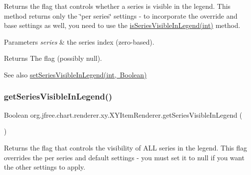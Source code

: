 Returns the flag that controls whether a series is visible in the legend. This method returns only the \char`\"{}per series\char`\"{} settings -\/ to incorporate the override and base settings as well, you need to use the \mbox{\hyperlink{interfaceorg_1_1jfree_1_1chart_1_1renderer_1_1xy_1_1_x_y_item_renderer_a20531f83ddd275c43cd996e59f0e3060}{is\+Series\+Visible\+In\+Legend(int)}} method.


\begin{DoxyParams}{Parameters}
{\em series} & the series index (zero-\/based).\\
\hline
\end{DoxyParams}
\begin{DoxyReturn}{Returns}
The flag (possibly {\ttfamily null}).
\end{DoxyReturn}
\begin{DoxySeeAlso}{See also}
\mbox{\hyperlink{interfaceorg_1_1jfree_1_1chart_1_1renderer_1_1xy_1_1_x_y_item_renderer_a2f4070365d96adda597ae686d9b195db}{set\+Series\+Visible\+In\+Legend(int, Boolean)}} 
\end{DoxySeeAlso}
\mbox{\label{interfaceorg_1_1jfree_1_1chart_1_1renderer_1_1xy_1_1_x_y_item_renderer_af24a5321d6c0f46cdca24e0795f90477}} 
\subsubsection{\texorpdfstring{get\+Series\+Visible\+In\+Legend()}{getSeriesVisibleInLegend()}\hspace{0.1cm}{\footnotesize\ttfamily [2/2]}}
{\footnotesize\ttfamily Boolean org.\+jfree.\+chart.\+renderer.\+xy.\+X\+Y\+Item\+Renderer.\+get\+Series\+Visible\+In\+Legend (\begin{DoxyParamCaption}{ }\end{DoxyParamCaption})}

Returns the flag that controls the visibility of A\+LL series in the legend. This flag overrides the per series and default settings -\/ you must set it to {\ttfamily null} if you want the other settings to apply.

